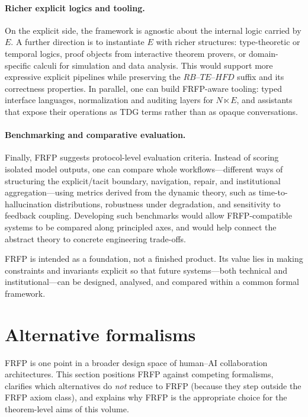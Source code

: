 \paragraph{Richer explicit logics and tooling.}
On the explicit side, the framework is agnostic about the internal logic carried by \(E\). A further direction is to instantiate \(E\) with richer structures: type-theoretic or temporal logics, proof objects from interactive theorem provers, or domain-specific calculi for simulation and data analysis. This would support more expressive explicit pipelines while preserving the \(RB\)--\(TE\)--\(HFD\) suffix and its correctness properties. In parallel, one can build FRFP-aware tooling: typed interface languages, normalization and auditing layers for \(N \ltimes E\), and assistants that expose their operations as TDG terms rather than as opaque conversations.

\paragraph{Benchmarking and comparative evaluation.}
Finally, FRFP suggests protocol-level evaluation criteria. Instead of scoring isolated model outputs, one can compare whole workflows---different ways of structuring the explicit/tacit boundary, navigation, repair, and institutional aggregation---using metrics derived from the dynamic theory, such as time-to-hallucination distributions, robustness under degradation, and sensitivity to feedback coupling. Developing such benchmarks would allow FRFP-compatible systems to be compared along principled axes, and would help connect the abstract theory to concrete engineering trade-offs.

FRFP is intended as a foundation, not a finished product. Its value lies in making constraints and invariants explicit so that future systems---both technical and institutional---can be designed, analysed, and compared within a common formal framework.

\section{Alternative formalisms}
\label{sec:alternative-formalisms}

FRFP is one point in a broader design space of human--AI collaboration architectures. This section
positions FRFP against competing formalisms, clarifies which alternatives do \emph{not} reduce to
FRFP (because they step outside the FRFP axiom class), and explains why FRFP is the appropriate
choice for the theorem-level aims of this volume.

